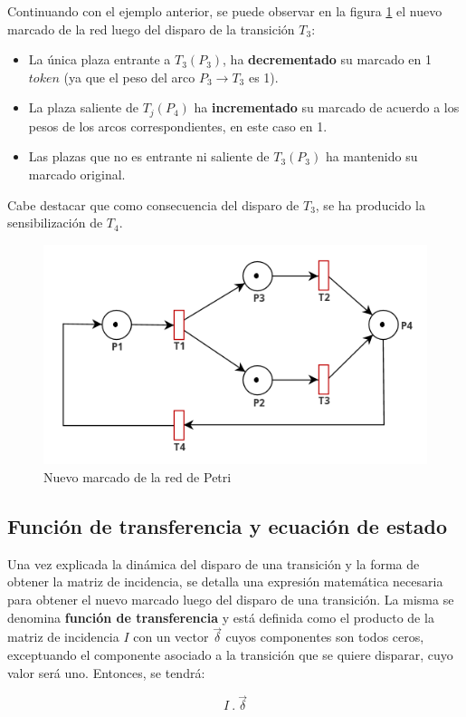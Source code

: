 Continuando con el ejemplo anterior, se puede observar en la figura \ref{fig:rdp_marcado_nuevo} el nuevo marcado de la red luego del disparo de la transición $T_3$:

\begin{itemize}
    \item La única plaza entrante a $T_3(P_3 )$, ha \textbf{decrementado} su marcado en 1 $token$ (ya que el peso del arco $P_3 \rightarrow T_3$ es 1).
    \item La plaza saliente de $T_j(P_4)$ ha \textbf{incrementado} su marcado de acuerdo a los pesos de los arcos correspondientes, en este caso en 1.
    \item Las plazas que no es entrante ni saliente de $T_3(P_3)$ ha mantenido su marcado original.
\end{itemize}

Cabe destacar que como consecuencia del disparo de $T_3$, se ha producido la sensibilización de $T_4$.

\begin{figure}[H]
    \centering
    \includegraphics[width=0.6\linewidth]{images/rdp_marcado_nuevo.png}
    \caption{Nuevo marcado de la red de Petri}
    \label{fig:rdp_marcado_nuevo}
\end{figure}

\subsection{Función de transferencia y ecuación de estado}
Una vez explicada la dinámica del disparo de una transición y la forma de obtener la matriz de incidencia, se detalla una expresión matemática necesaria para obtener el nuevo marcado luego del disparo de una transición. 
La misma se denomina \textbf{función de transferencia} y está definida como el producto de la matriz de incidencia $I$ con un vector $\vec{\delta}$ cuyos componentes son todos ceros, exceptuando el componente asociado a la transición que se quiere disparar, cuyo valor será uno. Entonces, se tendrá:

\begin{equation}
    I \ . \ \vec{\delta }
\end{equation}

